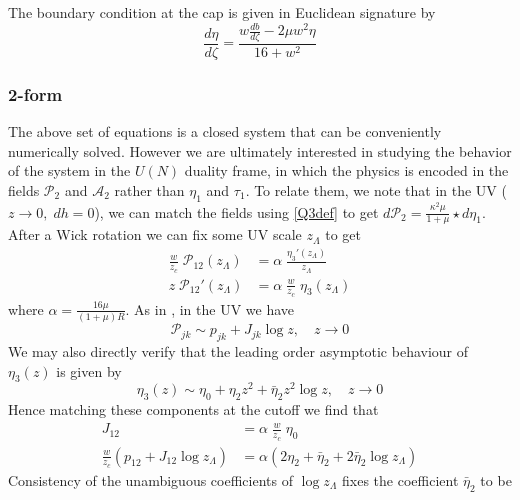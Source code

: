 \documentclass[aps,preprint,nofootinbib,preprintnumbers,eqsecnum,superscriptaddress]{revtex4}
\newcommand\sA{{\ensuremath{{\mathcal A}}}}
\newcommand\sP{{\mathcal P}}
\begin{document}
The boundary condition at the cap is given in Euclidean signature by
\begin{equation}
	\frac{d \eta}{d \zeta} = \frac{w \frac{db}{d\zeta} - 2 \mu w^2 \eta}{16 + w^2}
\end{equation}


\subsubsection{2-form}
The above set of equations is a closed system that can be conveniently numerically solved. However we are ultimately interested in studying the behavior of the system in the $U(N)$ duality frame, in which the physics is encoded in the fields $\sP_2$ and $\sA_2$ rather than $\eta_1$ and $\tau_1$. To relate them, we note that in the UV ($z \to 0, \; dh = 0$), we can match the fields using \eqref{Q3def} to get $d\mathcal{P}_2 = \frac{\kappa^2 \mu}{1+\mu} \star d\eta_1$. After a Wick rotation we can fix some UV scale $z_\Lambda$ to get
\begin{subequations}
	\begin{align}
		\frac{w}{z_c} \; \mathcal{P}_{12}(z_\Lambda) &= \alpha \; \frac{\eta_3'(z_\Lambda)}{z_\Lambda}	\\
		z \; \mathcal{P}_{12}'(z_\Lambda) & =  \alpha \; \frac{w}{z_c} \; \eta_3(z_\Lambda)
	\end{align}
\end{subequations}
where $\alpha = \frac{16 \mu}{(1+\mu)R}$.
As in \cite{Hofman:2017vwr}, in the UV we have
\begin{equation}
	\mathcal{P}_{jk} \sim p_{jk} + J_{jk} \log z, \quad z \to 0 \label{formofLog} 
\end{equation}
We may also directly verify that the leading order asymptotic behaviour of $\eta_3(z)$ is given by
\begin{equation}
	\eta_3(z) \sim \eta_0 + \eta_2 z^2 + \bar{\eta}_2 z^2 \log z, \quad z \to 0
\end{equation}
Hence matching these components at the cutoff we find that 
\begin{subequations}
	\begin{align}
		J_{12}											& = \alpha \; \frac{w}{z_c} \; \eta_0		\\
		\frac{w}{z_c} (p_{12} + J_{12} \log z_\Lambda)	& = \alpha \left(2 \eta_2 + \bar{\eta}_2 + 2 \bar{\eta}_2 \log z_\Lambda\right)
	\end{align}
\end{subequations}
Consistency of the unambiguous coefficients of $\log z_\Lambda$ fixes the coefficient $\bar{\eta}_2$ to be
\end{document}
